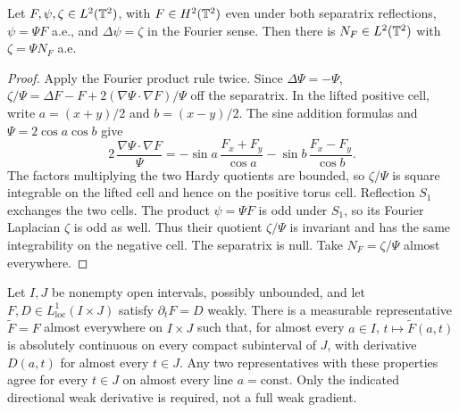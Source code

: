 \begin{lemma}
\label{lem:even-h2-dipole-laplacian}
\leanok
Let $F,\psi,\zeta\in L^2(\mathbb{T}^2)$, with $F\in H^2(\mathbb{T}^2)$ even under both
separatrix reflections, $\psi=\Psi F$ a.e., and $\Delta\psi=\zeta$ in the
Fourier sense. Then there is $N_F\in L^2(\mathbb{T}^2)$ with $\zeta=\Psi N_F$ a.e.
\end{lemma}

\begin{proof}
\leanok
Apply the Fourier product rule twice. Since $\Delta\Psi=-\Psi$,
$\zeta/\Psi=\Delta F-F+2(\nabla\Psi\cdot\nabla F)/\Psi$ off the
separatrix. In the lifted positive cell, write $a=(x+y)/2$ and
$b=(x-y)/2$. The sine addition formulas and $\Psi=2\cos a\cos b$
give
\[
 2\,\frac{\nabla\Psi\cdot\nabla F}{\Psi}
 =-\sin a\,\frac{F_x+F_y}{\cos a}
  -\sin b\,\frac{F_x-F_y}{\cos b}.
\]
The factors multiplying the two Hardy quotients are bounded, so
$\zeta/\Psi$ is square integrable on the lifted cell and hence on the
positive torus cell. Reflection $S_1$ exchanges the two cells. The
product $\psi=\Psi F$ is odd under $S_1$, so its Fourier Laplacian
$\zeta$ is odd as well. Thus their quotient $\zeta/\Psi$ is invariant
and has the same integrability on the negative cell. The separatrix is
null. Take $N_F=\zeta/\Psi$ almost everywhere.
\end{proof}

\begin{lemma}
\label{lem:acl-slicing}
\leanok
Let $I,J$ be nonempty open intervals, possibly unbounded, and let
$F,D\in L^1_{\mathrm{loc}}(I\times J)$ satisfy $\partial_tF=D$ weakly.
There is a measurable representative $\widetilde F=F$ almost everywhere
on $I\times J$ such that, for almost every $a\in I$,
$t\mapsto\widetilde F(a,t)$ is absolutely continuous on every compact
subinterval of $J$, with derivative $D(a,t)$ for almost every $t\in J$.
Any two representatives with these properties agree for every $t\in J$
on almost every line $a=\mathrm{const}$. Only the indicated directional
weak derivative is required, not a full weak gradient.
\end{lemma}

